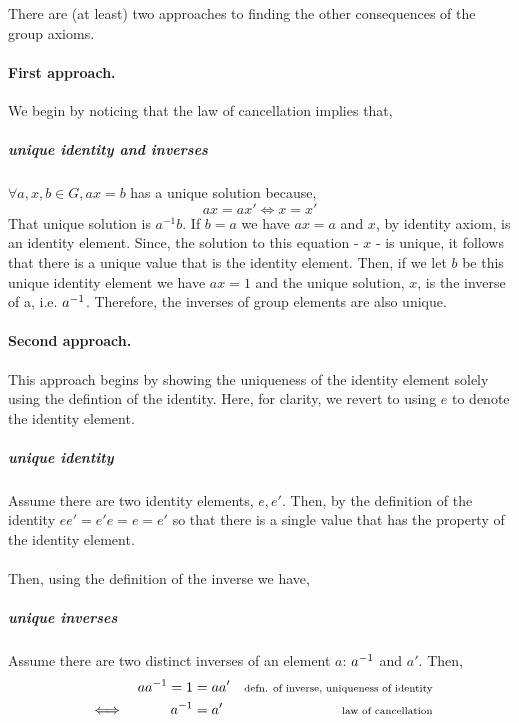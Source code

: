 \documentclass[MathsNotesBase.tex]{subfiles}
\begin{document}
{	\bigskip\bigskip
	There are (at least) two approaches to finding the other consequences of the group axioms.
	\paragraph*{First approach.} We begin by noticing that the law of cancellation implies that,
	\subparagraph*{unique identity and inverses}$\forall a,x,b \in G, ax = b$ has a unique solution because,
	\[ ax = ax' \iff x = x' \]
	That unique solution is $a^{-1}b$. If $b=a$ we have $ax=a$ and $x$, by identity axiom, is an identity element. Since, the solution to this equation - $x$ - is unique, it follows that there is a unique value that is the identity element. Then, if we let $b$ be this unique identity element we have $ax=1$ and the unique solution, $x$, is the inverse of a, i.e. ${a}^{-1}$. Therefore, the inverses of group elements are also unique.
	
	\paragraph*{Second approach.} This approach begins by showing the uniqueness of the identity element solely using the defintion of the identity. Here, for clarity, we revert to using $e$ to denote the identity element.
	\subparagraph*{unique identity} Assume there are two identity elements, $e, e'$. Then, by the definition of the identity $ee' = e'e = e = e'$ so that there is a single value that has the property of the identity element.\\\\
	Then, using the definition of the inverse we have,
	\subparagraph{unique inverses} Assume there are two distinct inverses of an element $a$: ${a}^{-1}$ and $a'$. Then, 
	\begin{align*}
	&& a{a}^{-1} = 1 &= aa' &\text{\scriptsize{defn. of inverse, uniqueness of identity}}\\
	& \iff & {a}^{-1} &= a' &\text{\scriptsize{law of cancellation}}
	\end{align*}
	\bigskip\bigskip

}
\end{document}
